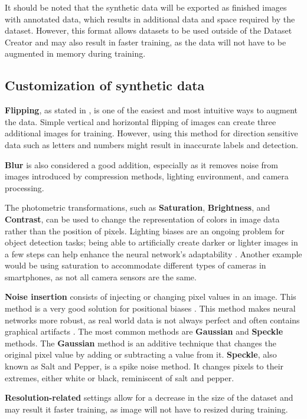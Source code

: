 It should be noted that the synthetic data will be exported as finished images with annotated data, which results in additional data and space required by the dataset. However, this format allows datasets to be used outside of the Dataset Creator and may also result in faster training, as the data will not have to be augmented in memory during training.

\subsection{Customization of synthetic data}
\textbf{Flipping}, as stated in \cite{dataAugmentation1}, is one of the easiest and most intuitive ways to augment the data. Simple vertical and horizontal flipping of images can create three additional images for training. However, using this method for direction sensitive data \cite{dataAugmentation1} such as letters and numbers might result in inaccurate labels and detection.

\textbf{Blur} is also considered a good addition, especially as it removes noise from images introduced by compression methods, lighting environment, and camera processing.

The photometric transformations, such as \textbf{Saturation}, \textbf{Brightness}, and \textbf{Contrast}, can be used to change the representation of colors in image data rather than the position of pixels. Lighting biases are an ongoing problem for object detection tasks; being able to artificially create darker or lighter images in a few steps can help enhance the neural network's adaptability \cite{dataAugmentation2}. Another example would be using saturation to accommodate different types of cameras in smartphones, as not all camera sensors are the same.

\textbf{Noise insertion} consists of injecting or changing pixel values in an image. This method is a very good solution for positional biases \cite{dataAugmentation2}. This method makes neural networks more robust, as real world data is not always perfect and often contains graphical artifacts \cite{dataAugmentation1}. The most common methods are \textbf{Gaussian} and \textbf{Speckle} methods. The \textbf{Gaussian} method is an additive technique that changes the original pixel value by adding or subtracting a value from it. \textbf{Speckle}, also known as Salt and Pepper, is a spike noise method. It changes pixels to their extremes, either white or black, reminiscent of salt and pepper.

\textbf{Resolution-related} settings allow for a decrease in the size of the dataset and may result it faster training, as image will not have to resized during training.

